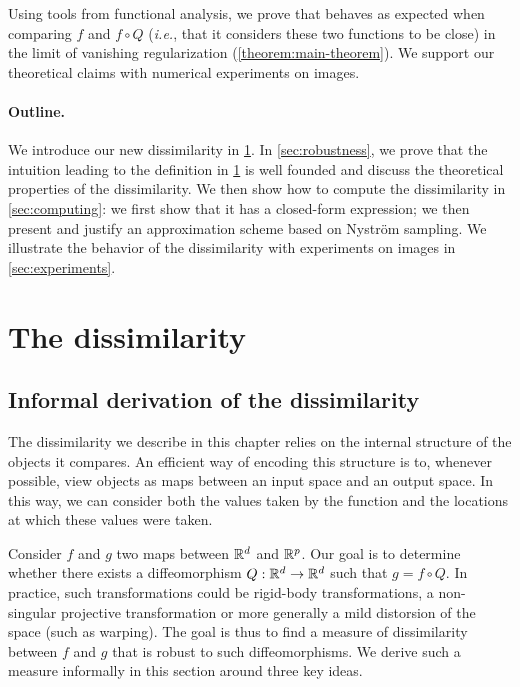 Using tools from functional analysis, we prove that \Diffy behaves as expected when comparing $f$ and $f\circ Q$ (\emph{i.e.}, that it considers these two functions to be close) in the limit of vanishing regularization (\cref{theorem:main-theorem}). We support our theoretical claims with numerical experiments on images.

\paragraph{Outline.} We introduce our new dissimilarity in \cref{sec:dissimilarity}. In \cref{sec:robustness}, we prove that the intuition leading to the definition in \cref{sec:dissimilarity} is well founded and discuss the theoretical properties of the dissimilarity. We then show how to compute the dissimilarity in \cref{sec:computing}: we first show that it has a closed-form expression; we then present and justify an approximation scheme based on Nyström sampling. We illustrate the behavior of the dissimilarity with experiments on images in \cref{sec:experiments}.

\section{The dissimilarity}\label{sec:dissimilarity}

\subsection{Informal derivation of the dissimilarity}\label{sec:informal}

The dissimilarity we describe in this chapter relies on the internal structure of the objects it compares. An efficient way of encoding this structure is to, whenever possible, view objects as maps between an input space and an output space. In this way, we can consider both the values taken by the function and the locations at which these values were taken.

Consider $f$ and $g$ two maps between $\mathbb R^d$ and $\mathbb R^p$. Our goal is to determine whether there exists a diffeomorphism $Q:\mathbb R^d \to \mathbb R^d$ such that $g = f \circ Q$. In practice, such transformations could be rigid-body transformations, a non-singular projective transformation or more generally a mild distorsion of the space (such as warping). The goal is thus to find a measure of dissimilarity between $f$ and $g$ that is robust to such diffeomorphisms. We derive such a measure informally in this section around three key ideas.

